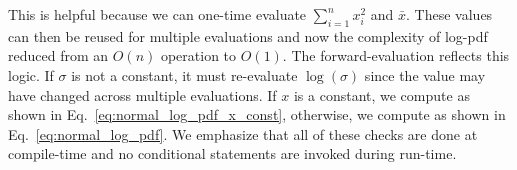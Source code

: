 This is helpful because we can one-time evaluate $\sum\limits_{i=1}^n x_i^2$ and $\bar{x}$.
These values can then be reused for multiple evaluations and now the complexity of log-pdf
reduced from an $O(n)$ operation to $O(1)$.
The forward-evaluation reflects this logic.
If $\sigma$ is not a constant, it must re-evaluate $\log(\sigma)$ 
since the value may have changed across multiple evaluations.
If $x$ is a constant, we compute as shown in Eq.~\ref{eq:normal_log_pdf_x_const},
otherwise, we compute as shown in Eq.~\ref{eq:normal_log_pdf}.
We emphasize that all of these checks are done at compile-time 
and no conditional statements are invoked during run-time.
